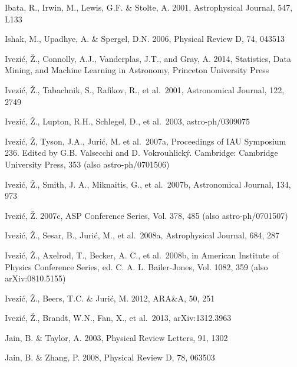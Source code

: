 \documentclass[twocolumn]{aastex61}
\begin{document}
\begin{thebibliography}{}
 Ibata, R., Irwin, M., Lewis, G.F. \& Stolte, A. 2001, Astrophysical Journal, 547, L133

 Ishak, M., Upadhye, A. \& Spergel, D.N. 2006, Physical Review D, 74, 043513

 Ivezi\'c, \v Z., Connolly, A.J., Vanderplas, J.T., and Gray, A. 2014, Statistics, Data Mining, and Machine Learning in Astronomy, Princeton University Press

 Ivezi\'{c}, \v{Z}., Tabachnik, S., Rafikov, R., et al.~2001, Astronomical Journal, 122, 2749

 Ivezi\'c, \v Z., Lupton, R.H., Schlegel, D., et al.~2003, astro-ph/0309075

 Ivezi\'{c}, \v{Z}, Tyson, J.A., Juri\'{c}, M. et al.~2007a, Proceedings of IAU Symposium 236. Edited by G.B. Valsecchi and D. Vokrouhlick\'{y}. Cambridge: Cambridge University Press, 353 (also astro-ph/0701506)

 Ivezi\'{c}, \v{Z}., Smith, J. A., Miknaitis, G., et al.~2007b, Astronomical Journal, 134, 973

 Ivezi\'{c}, \v{Z}. 2007c, ASP Conference Series, Vol. 378, 485 (also astro-ph/0701507)

 Ivezi\'c, \v Z., Sesar, B., Juri\'{c}, M., et al.~2008a, Astrophysical Journal, 684, 287

 Ivezi\'c, \v Z., Axelrod, T., Becker, A. C., et al.~2008b, in American Institute of Physics Conference Series, ed. C. A. L. Bailer-Jones, Vol. 1082, 359 (also arXiv:0810.5155)

 Ivezi\'c, \v Z., Beers, T.C. \& Juri\'{c}, M. 2012, ARA\&A, 50, 251

 Ivezi\'c, \v Z., Brandt, W.N., Fan, X., et al.~2013, arXiv:1312.3963

 Jain, B. \& Taylor, A. 2003, Physical Review Letters, 91, 1302

 Jain, B. \& Zhang, P. 2008, Physical Review D, 78, 063503


\end{thebibliography}
\end{document}
